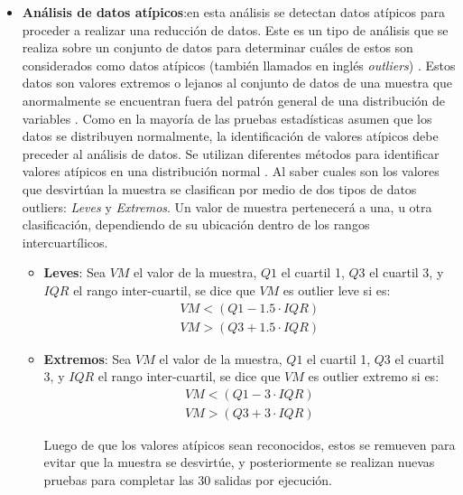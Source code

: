 \begin{enumerate}
    \begin{itemize}
        \item \textbf{Análisis de datos atípicos}:en esta análisis se detectan datos atípicos para proceder a realizar una reducción de datos. Este es un tipo de análisis que se realiza sobre un conjunto de datos para determinar cuáles de estos son considerados como datos atípicos (también llamados en inglés \textit{outliers}) \cite{VijayBala2019}. Estos datos son valores extremos o lejanos al conjunto de datos de una muestra que anormalmente se encuentran fuera del patrón general de una distribución de variables \cite{kjae2017}. Como en la mayoría de las pruebas estadísticas asumen que los datos se distribuyen normalmente, la identificación de valores atípicos debe preceder al análisis de datos. Se utilizan diferentes métodos para identificar valores atípicos en una distribución normal \cite{kjae2017}. Al saber cuales son los valores que desvirtúan la muestra se clasifican por medio de dos tipos de datos outliers: \textit{Leves} y \textit{Extremos}. Un valor de muestra pertenecerá a una, u otra clasificación, dependiendo de su ubicación dentro de los rangos intercuartílicos.

        \begin{itemize}
            \item \textbf{Leves}: Sea $VM$ el valor de la muestra, $Q1$ el cuartil 1, $Q3$ el cuartil 3, y $IQR$ el rango inter-cuartil, se dice que $VM$ es outlier leve si es:
            \begin{align*}
                VM < (Q1 - 1.5 \cdot IQR) \\
                VM > (Q3 + 1.5 \cdot IQR)
            \end{align*}

            \item \textbf{Extremos}: Sea $VM$ el valor de la muestra, $Q1$ el cuartil 1, $Q3$ el cuartil 3, y $IQR$ el rango inter-cuartil, se dice que $VM$ es outlier extremo si es:
            \begin{align*}
                VM < (Q1 - 3 \cdot IQR) \\
                VM > (Q3 + 3 \cdot IQR)
            \end{align*}

            Luego de que los valores atípicos sean reconocidos, estos se remueven para evitar que la muestra se desvirtúe, y posteriormente se realizan nuevas pruebas para completar las 30 salidas por ejecución.


\end{itemize}
\end{itemize}
\end{enumerate}

